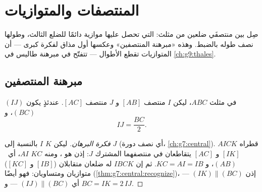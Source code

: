 \chapter{المنتصفات والمتوازيات}\label{ch:g8:midpoints}

صِل بين منتصفَي ضلعين من مثلث:  التي تحصل عليها
موازية دائمًا للضلع الثالث، وطولها نصف طوله بالضبط. وهذه
«مبرهنة المنتصفين» وعكسها أول مذاق لفكرة كبرى ---
أن المتوازيات تقطع الأطوال  --- تتفتّح
في مبرهنة طاليس في \cref{ch:g9:thales}.

\section{مبرهنة المنتصفين}

\begin{theorem}\label{thm:g8:midpoints:direct}
في مثلث $ABC$، ليكن $I$ منتصف $[AB]$ و $J$
منتصف $[AC]$. عندئذٍ يكون  $(IJ)$   $(BC)$، و
\[
IJ = \frac{BC}{2} .
\]
\end{theorem}

\begin{proof}[فكرة البرهان]
ليكن $K$  $I$ بالنسبة إلى $J$ (أي نصف دورة،
\cref{ch:g7:central}).  $AICK$ قطراه $[IK]$
و $[AC]$ يتقاطعان في منتصفهما المشترك $J$: إذن هو
، ومنه $KC$   $AI$، أي\  $(AB)$، و
$KC = AI = IB$. ثم إن $IBCK$ له ضلعان متقابلان ($[IB]$ و
$[KC]$) متوازيان ومتساويان: فهو  أيضًا
(\cref{thm:g7:central:recognize})، إذن $(IK) \parallel (BC)$ ---
أي $(IJ) \parallel (BC)$ --- و $BC = IK = 2\,IJ$.
\end{proof}

